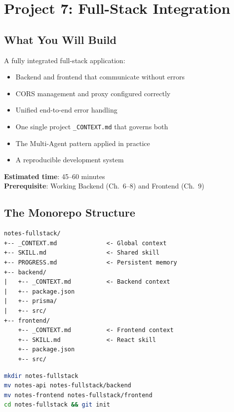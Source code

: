 \chapter{Project 7: Full-Stack Integration}

\section*{What You Will Build}
A fully integrated full-stack application:
\begin{itemize}
  \item Backend and frontend that communicate without errors
  \item CORS management and proxy configured correctly
  \item Unified end-to-end error handling
  \item One single project \texttt{\_CONTEXT.md} that governs both
  \item The Multi-Agent pattern applied in practice
  \item A reproducible development system
\end{itemize}

\textbf{Estimated time}: 45--60 minutes\\
\textbf{Prerequisite}: Working Backend (Ch.~6--8) and Frontend (Ch.~9)

\section{The Monorepo Structure}

\begin{praticabox}[title={Hands-On --- Organize the workspace}]
\begin{lstlisting}[language={}]
notes-fullstack/
+-- _CONTEXT.md              <- Global context
+-- SKILL.md                 <- Shared skill
+-- PROGRESS.md              <- Persistent memory
+-- backend/
|   +-- _CONTEXT.md          <- Backend context
|   +-- package.json
|   +-- prisma/
|   +-- src/
+-- frontend/
    +-- _CONTEXT.md          <- Frontend context
    +-- SKILL.md             <- React skill
    +-- package.json
    +-- src/
\end{lstlisting}
\begin{lstlisting}[language=bash]
mkdir notes-fullstack
mv notes-api notes-fullstack/backend
mv notes-frontend notes-fullstack/frontend
cd notes-fullstack && git init
\end{lstlisting}
\end{praticabox}

